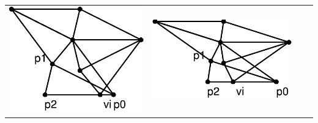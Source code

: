 \documentclass{article}
\begin{document}
\begin{tabular}{cccc}
\includegraphics[scale=.30]{no2-3} &
\includegraphics[scale=.30]{no2-4} 
\end{tabular}
\end{document}
